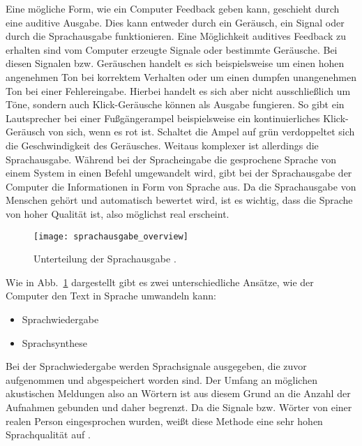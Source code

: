 Eine mögliche Form, wie ein Computer Feedback geben kann, geschieht durch eine auditive Ausgabe. Dies kann entweder durch ein Geräusch, ein Signal oder durch die Sprachausgabe funktionieren.
\newline \newline
Eine Möglichkeit auditives Feedback zu erhalten sind vom Computer erzeugte Signale oder bestimmte Geräusche. Bei diesen Signalen bzw. Geräuschen handelt es sich beispielsweise um einen hohen angenehmen Ton bei korrektem Verhalten oder um einen dumpfen unangenehmen Ton bei einer Fehlereingabe. Hierbei handelt es sich aber nicht ausschließlich um Töne, sondern auch Klick-Geräusche können als Ausgabe fungieren. So gibt ein Lautsprecher bei einer Fußgängerampel beispielsweise ein kontinuierliches Klick-Geräusch von sich, wenn es rot ist. Schaltet die Ampel auf grün verdoppeltet sich die Geschwindigkeit des Geräusches.
\newline \newline
Weitaus komplexer ist allerdings die Sprachausgabe. Während bei der Spracheingabe die gesprochene Sprache von einem System in einen Befehl umgewandelt wird, gibt bei der Sprachausgabe der Computer die Informationen in Form von Sprache aus. Da die Sprachausgabe von Menschen gehört und automatisch bewertet wird, ist es wichtig, dass die Sprache von hoher Qualität ist, also möglichst real erscheint. 
\newline
\begin{figure}
\centering
\texttt{[image: sprachausgabe\_overview]}
\caption{Unterteilung der Sprachausgabe \cite{FellbaumSprache}.}
\label{fig:SprachausgabeOverview}
\end{figure}
%	
Wie in Abb.~\ref{fig:SprachausgabeOverview} dargestellt gibt es zwei unterschiedliche Ansätze, wie der Computer den Text in Sprache umwandeln kann:
\begin{itemize}
      \item Sprachwiedergabe
      \item Sprachsynthese
\end{itemize}
\newpage
Bei der Sprachwiedergabe werden Sprachsignale ausgegeben, die zuvor aufgenommen und abgespeichert worden sind. Der Umfang an möglichen akustischen Meldungen also an Wörtern ist aus diesem Grund an die Anzahl der Aufnahmen gebunden und daher begrenzt. Da die Signale bzw. Wörter von einer realen Person eingesprochen wurden, weißt diese Methode eine sehr hohen Sprachqualität auf \cite{KaufmannPfisterSprache}.

